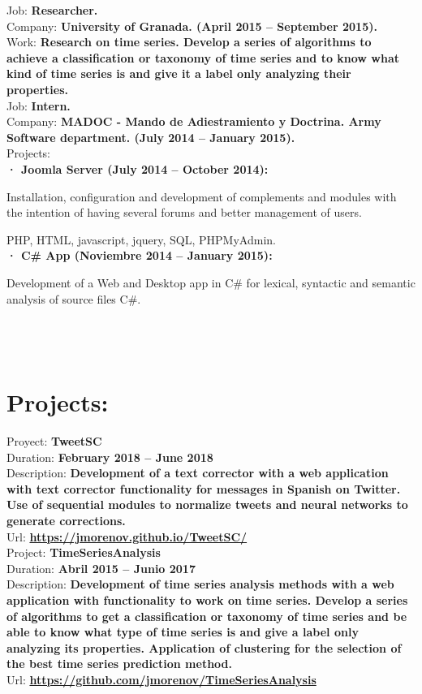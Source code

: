 \documentclass	[10pt,a4paper,oneside]{article}
\newcommand{\seccion}[1]{\vspace*{3mm}\section*{#1}\vspace*{-3mm}}
\begin{document}
Job: \textbf{Researcher.}\\
Company: \textbf{University of Granada. (April 2015 – September 2015).}\\
Work: \textbf{Research on time series. Develop a series of algorithms to achieve a classification or taxonomy of time series and to know what kind of time series is and give it a label only analyzing their properties.}\\

Job: \textbf{Intern.}\\
Company: \textbf{MADOC - Mando de Adiestramiento y Doctrina. Army Software department. (July 2014 – January 2015).}\\
Projects:\\
\hspace*{1cm}\textbf{· Joomla Server (July 2014 – October 2014):}\par
{\addtolength{\leftskip}{2cm}Installation, configuration and development of complements and modules with the intention of having several forums and better management of users.\par}
\hspace*{2cm}PHP, HTML, javascript, jquery, SQL, PHPMyAdmin.\\
\hspace*{1cm}\textbf{· C\# App (Noviembre 2014 – January 2015):}\par
{\addtolength{\leftskip}{2cm}
Development of a Web and Desktop app in C\# for lexical, syntactic and semantic analysis of source files C\#.\\\\\\\\\par}

\seccion{Projects:}

Proyect: \textbf{TweetSC}\\
Duration: \textbf{February 2018 – June 2018}\\
Description: \textbf{Development of a text corrector with a web application with text corrector functionality for messages in Spanish on Twitter. Use of sequential modules to normalize tweets and neural networks to generate corrections.}\\
Url: \textbf{\url{https://jmorenov.github.io/TweetSC/}}\\

Project: \textbf{TimeSeriesAnalysis}\\
Duration: \textbf{Abril 2015 – Junio 2017}\\
Description: \textbf{Development of time series analysis methods with a web application with functionality to work on time series. Develop a series of algorithms to get a classification or taxonomy of time series and be able to know what type of time series is and give a label only analyzing its properties. Application of clustering for the selection of the best time series prediction method.}\\
Url: \textbf{\url{https://github.com/jmorenov/TimeSeriesAnalysis}}
\end{document}
